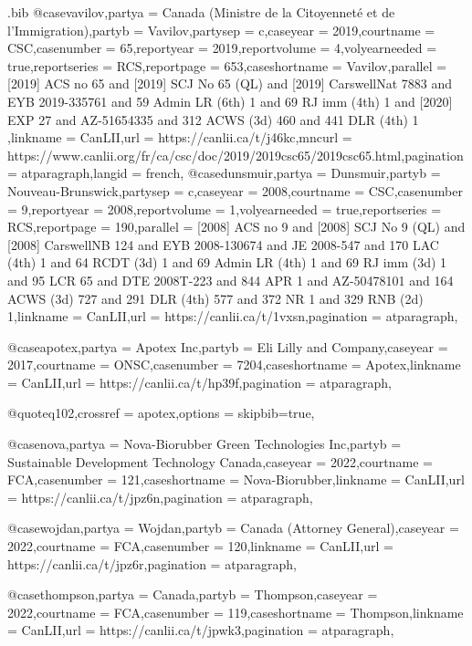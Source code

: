 \begin{filecontents*}[overwrite]{\jobname.bib}
@case{vavilov,partya = {Canada (Ministre de la Citoyenneté et de l’Immigration)},partyb = {Vavilov},partysep = {c},caseyear = {2019},courtname = {CSC},casenumber = {65},reportyear = {2019},reportvolume = {4},volyearneeded = {true},reportseries = {RCS},reportpage = {653},caseshortname = {Vavilov},parallel = { [2019] ACS no 65 and [2019] SCJ No 65 (QL) and [2019] CarswellNat 7883 and EYB 2019-335761 and 59 Admin LR (6th) 1 and 69 RJ imm (4th) 1 and [2020] EXP 27 and AZ-51654335 and 312 ACWS (3d) 460 and 441 DLR (4th) 1 },linkname = {CanLII},url = {https://canlii.ca/t/j46kc},mncurl = {https://www.canlii.org/fr/ca/csc/doc/2019/2019csc65/2019csc65.html},pagination = {atparagraph},langid = {french},}
@case{dunsmuir,partya = {Dunsmuir},partyb = {Nouveau-Brunswick},partysep = {c},caseyear = {2008},courtname = {CSC},casenumber = {9},reportyear = {2008},reportvolume = {1},volyearneeded = {true},reportseries = {RCS},reportpage = {190},parallel = { [2008] ACS no 9 and [2008] SCJ No 9 (QL) and [2008] CarswellNB 124 and EYB 2008-130674 and JE 2008-547 and 170 LAC (4th) 1 and 64 RCDT (3d) 1 and 69 Admin LR (4th) 1 and 69 RJ imm (3d) 1 and 95 LCR 65 and DTE 2008T-223 and 844 APR 1 and AZ-50478101 and 164 ACWS (3d) 727 and 291 DLR (4th) 577 and 372 NR 1 and 329 RNB (2d) 1},linkname = {CanLII},url = {https://canlii.ca/t/1vxsn},pagination = {atparagraph},}

@case{apotex,partya = {Apotex Inc},partyb = {Eli Lilly and Company},caseyear = {2017},courtname = {ONSC},casenumber = {7204},caseshortname = {Apotex},linkname = {CanLII},url = {https://canlii.ca/t/hp39f},pagination = {atparagraph},}

@quote{q102,crossref = {apotex},options = {skipbib=true},}

@case{nova,partya = {Nova-Biorubber Green Technologies Inc},partyb = {Sustainable Development Technology Canada},caseyear = {2022},courtname = {FCA},casenumber = {121},caseshortname = {Nova-Biorubber},linkname = {CanLII},url = {https://canlii.ca/t/jpz6n},pagination = {atparagraph},}

@case{wojdan,partya = {Wojdan},partyb = {Canada (Attorney General)},caseyear = {2022},courtname = {FCA},casenumber = {120},linkname = {CanLII},url = {https://canlii.ca/t/jpz6r},pagination = {atparagraph},}

@case{thompson,partya = {Canada},partyb = {Thompson},caseyear = {2022},courtname = {FCA},casenumber = {119},caseshortname = {Thompson},linkname = {CanLII},url = {https://canlii.ca/t/jpwk3},pagination = {atparagraph},}


\end{filecontents*}
